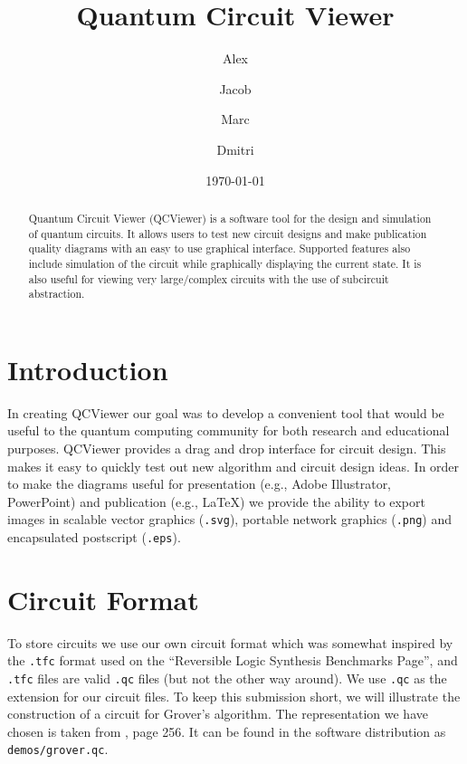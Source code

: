 \documentclass[aps,prl,reprint,floatfix,superscriptaddress]{revtex4-1} %
\begin{document}

\title{Quantum Circuit Viewer}
\date{\today}
\author{Alex }
\author{Jacob }
\author{Marc }
\author{Dmitri }
\begin{abstract}
Quantum Circuit Viewer (QCViewer) is a software tool for the design and simulation of quantum circuits.  
It allows users to test new circuit designs and make publication quality diagrams with an easy to use graphical interface.  
Supported features also include simulation of the circuit while graphically displaying the current state.
It is also useful for viewing very large/complex circuits with the use of subcircuit abstraction.
\end{abstract}
\maketitle

\section{Introduction}
In creating QCViewer our goal was to develop a convenient tool that would be useful to
the quantum computing community for both research and educational purposes. QCViewer 
provides a drag and drop interface for circuit design.  This makes it easy to quickly
test out new algorithm and circuit design ideas.  In order to make the diagrams useful for presentation 
(e.g., Adobe Illustrator, PowerPoint) and publication (e.g., \LaTeX) we provide the ability to export images in scalable
vector graphics (\verb+.svg+), portable network graphics (\verb+.png+) and encapsulated postscript (\verb+.eps+).
\section{Circuit Format}
To store circuits we use our own circuit format which was somewhat 
inspired by the \verb+.tfc+ format used on the ``Reversible Logic Synthesis Benchmarks Page''\cite{maslovBench}, and \verb+.tfc+ files are valid \verb+.qc+ files (but not the other way around).
We use \verb+.qc+ as the extension for our circuit files.
To keep this submission short, we will illustrate the construction of a circuit for Grover's algorithm.  
The representation we have chosen is taken from \cite{nielsen2000quantum}, page 256.
It can be found in the software distribution as \verb+demos/grover.qc+.
\end{document}
